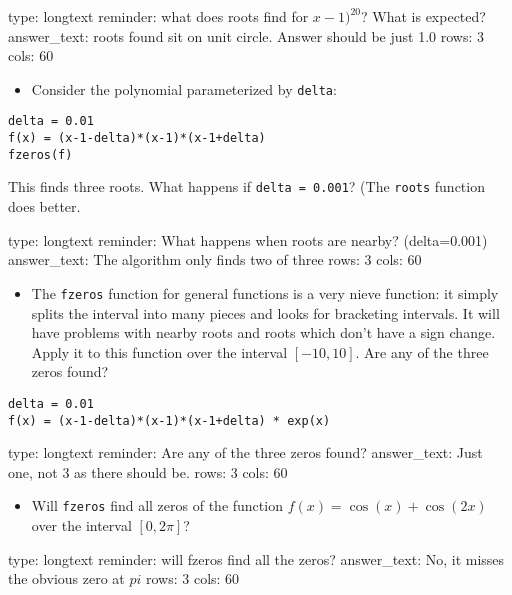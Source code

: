 \documentclass[12pt]{article}
\begin{document}
\begin{answer}
type: longtext
reminder: what does roots find for \( x-1)^20 \)? What is expected?
answer_text: roots found sit on unit circle. Answer should be just 1.0 
rows: 3
cols: 60
\end{answer}

\begin{itemize}
\itemsep1pt\parskip0pt
\item
  Consider the polynomial parameterized by \texttt{delta}:
\end{itemize}



\begin{verbatim}
delta = 0.01
f(x) = (x-1-delta)*(x-1)*(x-1+delta)
fzeros(f)
\end{verbatim}
This finds three roots. What happens if \texttt{delta = 0.001}? (The
\texttt{roots} function does better.

\begin{answer}
type: longtext
reminder: What happens when roots are nearby? (delta=0.001)
answer_text: The algorithm only finds two of three 
rows: 3
cols: 60
\end{answer}

\begin{itemize}
\itemsep1pt\parskip0pt
\item
  The \texttt{fzeros} function for general functions is a very nieve
  function: it simply splits the interval into many pieces and looks for
  bracketing intervals. It will have problems with nearby roots and
  roots which don't have a sign change. Apply it to this function over
  the interval $[-10,10]$. Are any of the three zeros found?
\end{itemize}



\begin{verbatim}
delta = 0.01
f(x) = (x-1-delta)*(x-1)*(x-1+delta) * exp(x)
\end{verbatim}
\begin{answer}
type: longtext
reminder: Are any of the three zeros found?
answer_text: Just one, not 3 as there should be. 
rows: 3
cols: 60
\end{answer}

\begin{itemize}
\itemsep1pt\parskip0pt
\item
  Will \texttt{fzeros} find all zeros of the function
  $f(x) = \cos(x) + \cos(2x)$ over the interval $[0,2\pi]$?
\end{itemize}

\begin{answer}
type: longtext
reminder: will fzeros find all the zeros?
answer_text: No, it misses the obvious zero at \( pi \) 
rows: 3
cols: 60
\end{answer}
\end{document}
